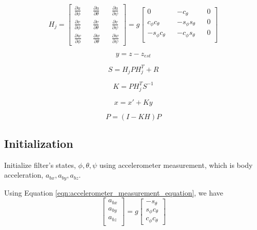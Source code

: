 \documentclass[]{article}
\begin{document}
\begin{equation}
	H_j = 
	\begin{bmatrix}
		\frac{\partial \dot{u}}{\partial \phi} && \frac{\partial \dot{u}}{\partial \theta} && \frac{\partial \dot{u}}{\partial \psi} \\
		\frac{\partial \dot{v}}{\partial \phi} && \frac{\partial \dot{v}}{\partial \theta} && \frac{\partial \dot{v}}{\partial \psi} \\
		\frac{\partial \dot{w}}{\partial \phi} && \frac{\partial \dot{w}}{\partial \theta} && \frac{\partial \dot{w}}{\partial \psi}
	\end{bmatrix} = g
	\begin{bmatrix}
		0 && -c_{\theta} && 0 \\
		c_{\phi}c_{\theta} && -s_{\phi}s_{\theta} && 0 \\
		-s_{\phi}c_{\theta} && -c_{\phi}s_{\theta} && 0 \\
	\end{bmatrix}
\end{equation}

\begin{equation}
	y = z - z_{est}\label{eqn:measurement_difference}
\end{equation}

\begin{equation}
	S = H_j P H_j^T + R\label{eqn:innovation_covariance}
\end{equation}

\begin{equation}
	K = P H_j^T S^{-1}\label{eqn:kalman_gain}
\end{equation}

\begin{equation}
	x = x' + Ky\label{eqn:updated_states}
\end{equation}

\begin{equation}
	P = (I-KH)P\label{eqn:updated_covariance}
\end{equation}


\subsection{Initialization}
Initialize filter's states, $\phi, \theta, \psi$ using accelerometer measurement, which is body acceleration, $a_{bx}, a_{by}, a_{bz}$.

Using Equation \ref{eqn:accelerometer_measurement_equation}, we have 
\begin{equation}
\begin{bmatrix}
a_{bx} \\
a_{by} \\
a_{bz} \\
\end{bmatrix} = g
\begin{bmatrix}
-s_\theta \\
s_\phi c_\theta \\
c_\phi c_\theta
\end{bmatrix}
\end{equation}
\end{document}
